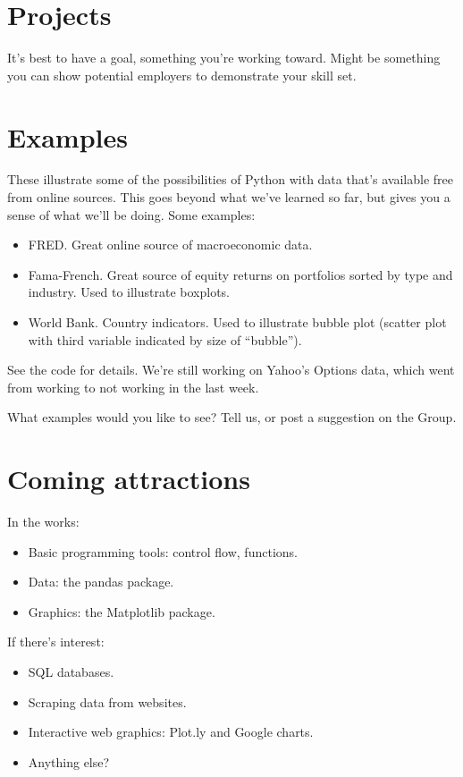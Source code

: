 \documentclass[11pt]{article}
\begin{document}
\section{Projects}


It's best to have a goal, something you're working toward.
Might be something you can show potential employers to
demonstrate your skill set.


\section{Examples}

These illustrate some of the possibilities of Python
with data that's available free from online sources.
This goes beyond what we've learned so far, but gives you a sense
of what we'll be doing.
Some examples:
\begin{itemize}
\item FRED.  Great online source of macroeconomic data.
\item Fama-French.  Great source of equity returns on portfolios sorted by type and industry.
Used to illustrate boxplots.
\item World Bank.  Country indicators. Used to illustrate bubble plot (scatter plot with third variable
indicated by size of ``bubble'').
\end{itemize}
See the code for details.
We're still working on Yahoo's Options data,
which went from working to not working in the last week.

What examples would you like to see?
Tell us, or post a suggestion on the Group.


\section{Coming attractions}

In the works:
\begin{itemize}
\item Basic programming tools:  control flow, functions.
\item Data:  the pandas package.
\item Graphics:  the Matplotlib package.
\end{itemize}

If there's interest:
\begin{itemize}
\item SQL databases.
\item Scraping data from websites.
\item Interactive web graphics:  Plot.ly and Google charts.
\item Anything else?
\end{itemize}
\end{document}
